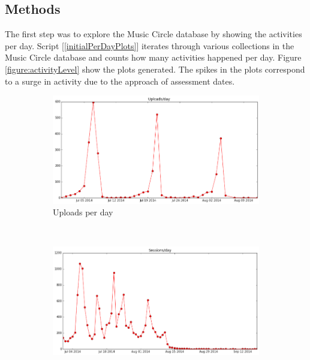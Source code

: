 \documentclass[11pt, oneside]{article}   	%
\begin{document}
\subsection{Methods}
The first step was to explore the Music Circle database by showing the activities per day. Script [\ref{initialPerDayPlots}] iterates through various collections in the Music Circle database and counts how many activities happened per day. Figure \ref{figure:activityLevel} show the plots generated. The spikes in the plots correspond to a surge in activity due to the approach of assessment dates.
\begin{figure}
        \centering
        \begin{subfigure}[b]{0.45\textwidth}
                \includegraphics[width=\textwidth]{./uploadsPerDay.png}
                \caption{Uploads per day}
                \label{uploadsPerDay}
        \end{subfigure}%
        ~ %
        \begin{subfigure}[b]{0.45\textwidth}
                \includegraphics[width=\textwidth]{sessionsPerDay.png}

\end{subfigure}
\end{figure}
\end{document}
